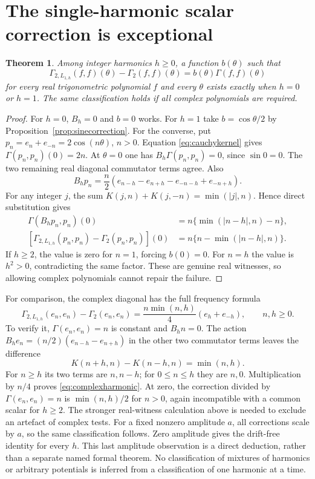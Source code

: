 \documentclass[11pt]{article}
\newtheorem{theorem}{Theorem}[section]
\begin{document}
\section{The single-harmonic scalar correction is exceptional}
\begin{theorem}\label{thm:harmonicclassification}
Among integer harmonics $h\geq0$, a function $b(\theta)$ such that
\[
 \Gamma_{2,L_{1,h}}(f,f)(\theta)-\Gamma_2(f,f)(\theta)
   =b(\theta)\Gamma(f,f)(\theta)
\]
for every real trigonometric polynomial $f$ and every $\theta$
exists exactly when $h=0$ or $h=1$. The same classification holds
if all complex polynomials are required.
\end{theorem}
\begin{proof}
For $h=0$, $B_h=0$ and $b=0$ works. For $h=1$ take
$b=\cos\theta/2$ by Proposition~\ref{prop:sinecorrection}.
For the converse, put $p_n=e_n+e_{-n}=2\cos(n\theta)$, $n>0$.
Equation \eqref{eq:cauchykernel} gives $\Gamma(p_n,p_n)(0)=2n$.
At $\theta=0$ one has $B_h\Gamma(p_n,p_n)=0$, since $\sin0=0$.
The two remaining real diagonal commutator terms agree. Also
\[
 B_hp_n=\frac n2(e_{n-h}-e_{n+h}-e_{-n-h}+e_{-n+h}).
\]
For any integer $j$, the sum
$K(j,n)+K(j,-n)=\min(|j|,n)$. Hence direct substitution gives
\begin{align*}
 \Gamma(B_hp_n,p_n)(0)
 &=n\{\min(|n-h|,n)-n\},\\
 [\Gamma_{2,L_{1,h}}(p_n,p_n)-\Gamma_2(p_n,p_n)](0)
 &=n\{n-\min(|n-h|,n)\}.
\end{align*}
If $h\geq2$, the value is zero for $n=1$, forcing $b(0)=0$.
For $n=h$ the value is $h^2>0$, contradicting the same factor.
These are genuine real witnesses, so allowing complex polynomials
cannot repair the failure.
\end{proof}

For comparison, the complex diagonal has the full frequency formula
\begin{equation}\label{eq:complexharmonic}
 \Gamma_{2,L_{1,h}}(e_n,e_n)-\Gamma_2(e_n,e_n)
 =\frac{n\min(n,h)}4(e_h+e_{-h}),\qquad n,h\geq0.
\end{equation}
To verify it, $\Gamma(e_n,e_n)=n$ is constant and $B_hn=0$.
The action $B_he_n=(n/2)(e_{n-h}-e_{n+h})$ in the other two
commutator terms leaves the difference
\[
 K(n+h,n)-K(n-h,n)=\min(n,h).
\]
For $n\geq h$ its two terms are $n,n-h$; for $0\leq n\leq h$
they are $n,0$. Multiplication by $n/4$ proves
\eqref{eq:complexharmonic}. At zero, the correction divided by
$\Gamma(e_n,e_n)=n$ is $\min(n,h)/2$ for $n>0$, again incompatible
with a common scalar for $h\geq2$. The stronger real-witness
calculation above is needed to exclude an artefact of complex tests.
For a fixed nonzero amplitude $a$, all corrections scale by $a$,
so the same classification follows. Zero amplitude gives the
drift-free identity for every $h$. This last amplitude observation
is a direct deduction, rather than a separate named formal theorem.
No classification of mixtures of harmonics or arbitrary potentials
is inferred from a classification of one harmonic at a time.
\end{document}
